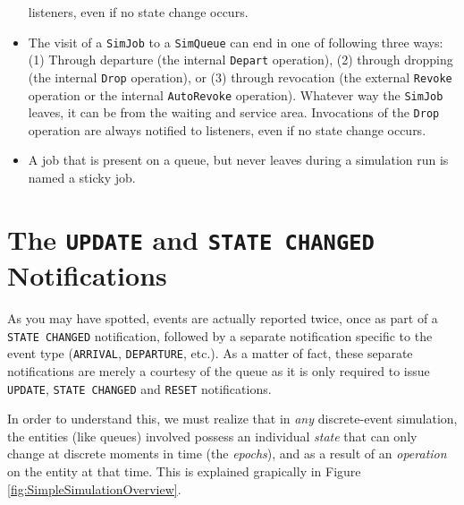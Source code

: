 \begin{itemize}
	listeners, even if no state change occurs.
	\item The visit of a \lstinline|SimJob| to a \lstinline|SimQueue|
	can end in one of following three ways: (1) Through departure
	(the internal \lstinline|Depart| operation), (2) through dropping
	(the internal \lstinline|Drop| operation), or (3) through revocation
	(the external \lstinline|Revoke| operation or the internal \lstinline|AutoRevoke| operation).
	Whatever way the \lstinline|SimJob| leaves, it can be from the waiting
	and service area.
	Invocations of the \lstinline|Drop| operation are always notified to
	listeners, even if no state change occurs.
	\item A job that is present on a queue, but never leaves during a simulation run
	is named a sticky job.
\end{itemize}

\section{The \texttt{UPDATE} and \texttt{STATE CHANGED} Notifications}

As you may have spotted,
events are actually reported twice,
once as part of a \lstinline|STATE CHANGED| notification,
followed by a separate notification specific to the event type
(\lstinline-ARRIVAL-, \lstinline-DEPARTURE-, etc.).
As a matter of fact, these separate notifications are merely a courtesy
of the queue as it is only required to issue
\lstinline|UPDATE|, \lstinline|STATE CHANGED| and \lstinline|RESET| notifications.

In order to understand this,
we must realize that in {\em any\/} discrete-event simulation,
the entities (like queues) involved possess an individual {\em state\/}
that can only change at discrete moments in time (the {\em epochs\/}),
and as a result of an {\em operation\/} on the entity at that time.
This is explained grapically in Figure \ref{fig:SimpleSimulationOverview}.

